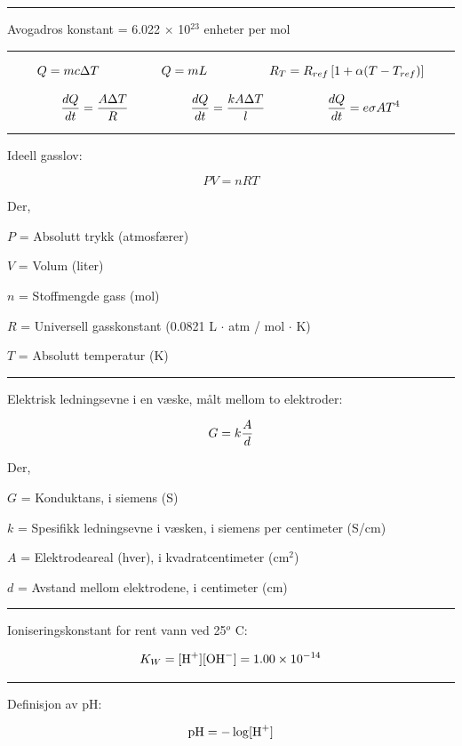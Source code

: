 

\vskip 5pt
\hrule
\vskip 5pt

\noindent
Avogadros konstant = 6.022 $\times$ 10$^{23}$ enheter per mol

\vskip 5pt
\hrule
\vskip 5pt

$$Q = mc \Delta T \hskip 50 pt Q = mL \hskip 50pt R_T = R_{ref} \left[1 + \alpha (T - T_{ref}) \right]$$

$${dQ \over dt} = {{A \Delta T} \over R} \hskip 50pt {dQ \over dt} = {{k A \Delta T} \over l} \hskip 50pt {dQ \over dt} = e \sigma A T^4$$

\vskip 5pt
\hrule
\vskip 5pt


\noindent
Ideell gasslov:

$$PV = nRT$$

\noindent
Der,

$P$ = Absolutt trykk (atmosfærer)

$V$ = Volum (liter)

$n$ = Stoffmengde gass (mol)

$R$ = Universell gasskonstant (0.0821 L $\cdot$ atm / mol $\cdot$ K)

$T$ = Absolutt temperatur (K)


\vskip 5pt
\hrule
\vskip 5pt

\noindent
Elektrisk ledningsevne i en væske, målt mellom to elektroder:

$$G = k{A \over d}$$

\noindent
Der,

$G$ = Konduktans, i siemens (S)

$k$ = Spesifikk ledningsevne i væsken, i siemens per centimeter (S/cm)

$A$ = Elektrodeareal (hver), i kvadratcentimeter (cm$^{2}$)

$d$ = Avstand mellom elektrodene, i centimeter (cm)

\vskip 5pt
\hrule
\vskip 5pt

\noindent
Ioniseringskonstant for rent vann ved 25$^{o}$ C:

$$K_W = [\hbox{H}^{+}] [\hbox{OH}^{-}] = 1.00 \times 10^{-14}$$ 

\vskip 5pt
\hrule
\vskip 5pt

\noindent
Definisjon av pH:

$$\hbox{pH} = - \log [\hbox{H}^{+}]$$

